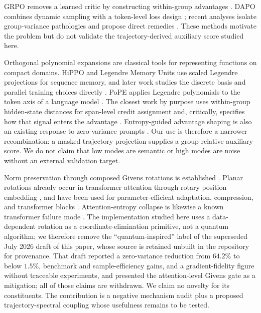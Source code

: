 \documentclass{article}
\newcommand{\grpo}{\textsc{GRPO}\xspace}
\begin{document}
\grpo removes a learned critic by constructing within-group advantages
\citep{shao2024deepseekmath}.  DAPO combines dynamic sampling with a
token-level loss design \citep{yu2025dapo}; recent analyses isolate
group-variance pathologies and propose direct remedies
\citep{nie2026gradient,he2026advantage}.  These methods motivate the problem
but do not validate the trajectory-derived auxiliary score studied here.

Orthogonal polynomial expansions are classical tools for representing
functions on compact domains.  HiPPO and Legendre Memory Units use scaled
Legendre projections for sequence memory, and later work studies the discrete
basis and parallel training choices directly
\citep{gu2020hippo,voelker2019lmu,chilkuri2021parallelizing}.  PoPE applies
Legendre polynomials to the token axis of a language model
\citep{aggarwal2024pope}.  The closest work by purpose uses within-group
hidden-state distances for span-level credit assignment and, critically,
specifies how that signal enters the advantage \citep{chen2026shear}.
Entropy-guided advantage shaping is also an existing response to zero-variance
prompts \citep{le2025noprompt}.  Our use is therefore a narrower recombination:
a masked trajectory projection supplies a group-relative auxiliary score.  We
do not claim that low modes are semantic or high modes are noise without an
external validation target.

Norm preservation through composed Givens rotations is established
\citep{dorobantu2016dizzyrnn,jing2017eunn,frerix2019givens}.  Planar rotations
already occur in transformer attention through rotary position embedding
\citep{su2024roformer}, and have been used for parameter-efficient adaptation,
compression, and transformer blocks
\citep{ma2024qoft,su2025rotatekv,abuayyash2026threephase}.  Attention-entropy
collapse is likewise a known transformer failure mode \citep{zhai2023entropy}.
The implementation studied here uses a data-dependent rotation as a
coordinate-elimination primitive, not a quantum algorithm; we therefore remove
the ``quantum-inspired'' label of the superseded July 2026 draft of this paper,
whose source is retained unbuilt in the repository for provenance.  That draft
reported a zero-variance reduction from $64.2\%$ to below $1.5\%$, benchmark and
sample-efficiency gains, and a gradient-fidelity figure without traceable
experiments, and presented the attention-level Givens gate as a mitigation;
all of those claims are withdrawn.  We
claim no novelty for its
constituents.  The contribution is a negative mechanism audit plus a proposed
trajectory-spectral coupling whose usefulness remains to be tested.
\end{document}
